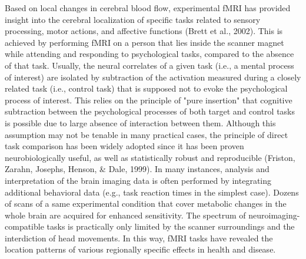 \documentclass[authoryear,review,3p]{elsarticle}
\begin{document}
Based on local changes in cerebral blood flow,
experimental fMRI has provided
insight into the cerebral localization
of specific tasks related to sensory processing, motor actions,
and affective functions
(Brett et al., 2002).
This is achieved by
performing fMRI on a person that lies
inside the scanner magnet
while attending and responding to psychological tasks,
compared to the absence of that task.
Usually, the neural correlates of a given task
(i.e., a mental process of interest) are isolated by subtraction
of the activation measured during a closely related task (i.e., control task)
that is supposed not to evoke the psychological process of interest.
This relies on the principle of "pure insertion" that
cognitive subtraction between the psychological processes of both
target and control tasks is possible due to large absence of
interaction between them.
Although this assumption may not be tenable in many
practical cases,
the principle of direct task comparison has been widely adopted
since it has been proven
neurobiologically useful, as well as statistically robust and reproducible
(Friston, Zarahn, Josephs, Henson, & Dale, 1999).
%
In many instances,
analysis and interpretation of the brain imaging data
is often performed by integrating additional
behavioral data (e.g., task reaction times in the simplest case).
Dozens of scans of a same experimental condition
that cover metabolic changes in the whole brain are acquired
for enhanced sensitivity.
%
The spectrum of neuroimaging-compatible tasks is practically
only limited by the scanner surroundings
and the interdiction of head movements.
%
In this way, fMRI tasks have revealed the location patterns of
various regionally specific effects in health and disease.
\end{document}
